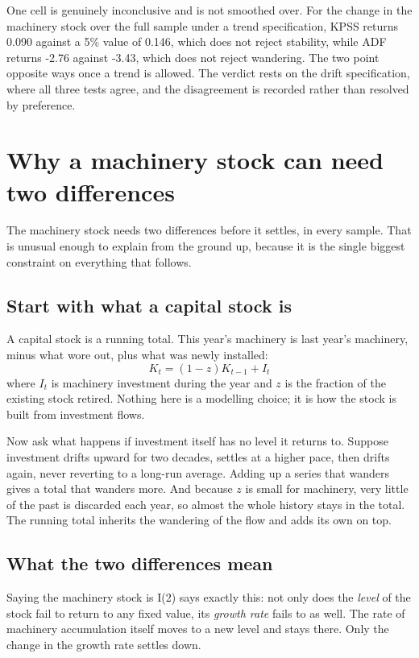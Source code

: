 \documentclass[11pt]{article}
\begin{document}
One cell is genuinely inconclusive and is not smoothed over. For the change in the machinery stock over the full sample under a trend specification, KPSS returns 0.090 against a 5\% value of 0.146, which does not reject stability, while ADF returns -2.76 against -3.43, which does not reject wandering. The two point opposite ways once a trend is allowed. The verdict rests on the drift specification, where all three tests agree, and the disagreement is recorded rather than resolved by preference.

\FloatBarrier
\section{Why a machinery stock can need two differences}

The machinery stock needs two differences before it settles, in every sample. That is unusual enough to explain from the ground up, because it is the single biggest constraint on everything that follows.

\subsection*{Start with what a capital stock is}

A capital stock is a running total. This year's machinery is last year's machinery, minus what wore out, plus what was newly installed:
\begin{equation}
K_t = (1 - z) K_{t-1} + I_t
\end{equation}
where $I_t$ is machinery investment during the year and $z$ is the fraction of the existing stock retired. Nothing here is a modelling choice; it is how the stock is built from investment flows.

Now ask what happens if investment itself has no level it returns to. Suppose investment drifts upward for two decades, settles at a higher pace, then drifts again, never reverting to a long-run average. Adding up a series that wanders gives a total that wanders more. And because $z$ is small for machinery, very little of the past is discarded each year, so almost the whole history stays in the total. The running total inherits the wandering of the flow and adds its own on top.

\subsection*{What the two differences mean}

Saying the machinery stock is I(2) says exactly this: not only does the \emph{level} of the stock fail to return to any fixed value, its \emph{growth rate} fails to as well. The rate of machinery accumulation itself moves to a new level and stays there. Only the change in the growth rate settles down.
\end{document}

